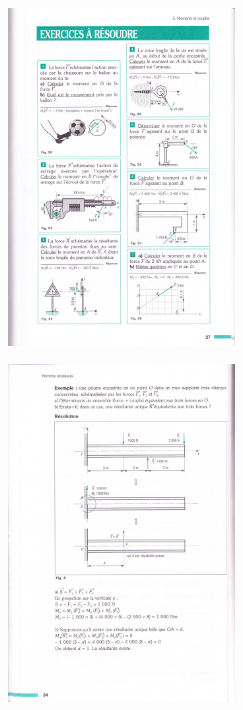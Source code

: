 \documentclass[10pt]{article}
\begin{document}
\begin{minipage}[c]{.45\linewidth}
\begin{center}
\includegraphics[width=6cm]{images/moment6.pdf}
\end{center}
\end{minipage} \hfill
\begin{minipage}[c]{.45\linewidth}
\begin{center}
\includegraphics[width=6cm]{images/poutre.pdf}
\end{center}
\end{minipage} 
\end{document}

